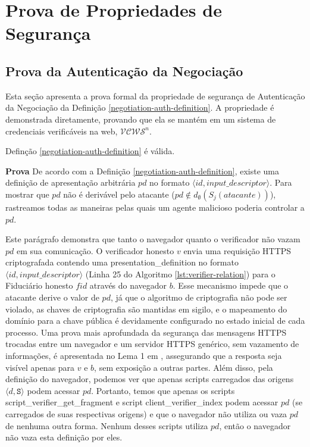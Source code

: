 \section{Prova de Propriedades de Segurança}

\subsection{Prova da Autenticação da Negociação}
Esta seção apresenta a prova formal da propriedade de segurança de Autenticação da Negociação da Definição \ref{negotiation-auth-definition}. A propriedade é demonstrada diretamente, provando que ela se mantém em um sistema de credenciais verificáveis na web, $\mathcal{VCWS}^n$.

\begin{lema}
Definção \ref{negotiation-auth-definition} é válida.
\end{lema}

\textbf{Prova} De acordo com a Definição \ref{negotiation-auth-definition}, existe uma definição de apresentação arbitrária $pd$ no formato $\langle id, input\_descriptor \rangle$. Para mostrar que $pd$ não é derivável pelo atacante ($pd \not \in d_{\emptyset}(S_j(atacante))$), rastreamos todas as maneiras pelas quais um agente malicioso poderia controlar a $pd$.

  Este parágrafo demonstra que tanto o navegador quanto o verificador não vazam $pd$ em sua comunicação. O verificador honesto $v$ envia uma requisição HTTPS criptografada contendo
  uma presentation\_definition no formato $ \langle id, input\_descriptor\rangle $ (Linha 25 do Algoritmo \ref{lst:verifier-relation}) para o Fiduciário honesto $fid$ através do navegador $b$. 
  Esse mecanismo impede que o atacante derive o valor de $pd$, já que o algoritmo de criptografia não pode ser violado, as chaves de criptografia são mantidas em sigilo, e o mapeamento do domínio para a chave pública é devidamente configurado no estado inicial de cada processo. 
  Uma prova mais aprofundada da segurança das mensagens HTTPS trocadas entre um navegador e um servidor HTTPS genérico, sem vazamento de informações, é apresentada no Lema 1 em \cite{fett2024wim}, assegurando que a resposta seja visível apenas para $v$ e $b$, sem exposição a outras partes.
  Além disso, pela definição do navegador, podemos ver que apenas scripts carregados das origens $\langle d, \texttt{S} \rangle$ podem acessar $pd$. 
  Portanto, temos que apenas os scripts script\_verifier\_get\_fragment e script client\_verifier\_index podem acessar $pd$ (se carregados de suas respectivas origens) e que o navegador não utiliza ou vaza $pd$ de nenhuma outra forma.
  Nenhum desses scripts utiliza $pd$, então o navegador não vaza esta definição por eles.
  
